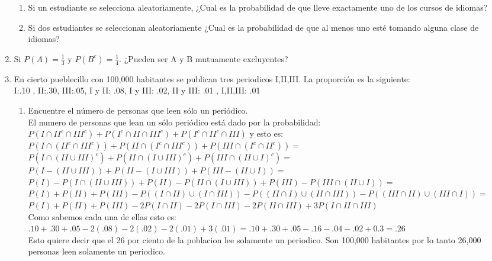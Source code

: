 \documentclass[12pt,a4paper]{report}
\begin{document}
\begin{enumerate}
{\begin{enumerate}[label=\alph*) ]
{   }

   \item {
   Si un estudiante se selecciona aleatoriamente, ¿Cual es la probabilidad de que lleve exactamente uno de los cursos de idiomas?\\

   }

   \item {
  Si dos estudiantes se seleccionan aleatoriamente ¿Cual es la probabilidad de que al menos uno esté tomando alguna clase de idiomas?\\

   }


	\end{enumerate}

	}

   \item {
  	Si $P(A) = \frac{1}{3}$ y $P(B^c)=\frac{1}{4}$. ¿Pueden ser A y B mutuamente excluyentes?
	}

   \item {
    En cierto pueblecillo con 100,000 habitantes se publican tres periodicos I,II,III. La proporción es la siguiente:\\
I:.10 , II:.30, III:.05, I y II: .08, I y III: .02, II y III: .01 , I,II,III: .01
	\begin{enumerate}[label=\alph*) ]
   \item {
   Encuentre el número de personas que leen sólo un periódico.\\
	El numero de personas que lean un sólo periódico está dado por la probabilidad:\\
	$P(I \cap II^c\cap III^c)+P(I^c \cap II\cap III^c)+P(I^c \cap II^c\cap III)$ y esto es:\\
	$P(I \cap( II^c \cap III^c))+ P(II\cap(I^c \cap III^c))+P(III \cap (I^c \cap II^c))=$ \\
	$P(I \cap (II \cup III)^c)+P(II \cap (I \cup III)^c)+P(III \cap (II \cup I)^c)=$\\
	$P(I-(II\cup III))+P(II-(I \cup III))+P(III-(II \cup I))=$\\
	$P(I)-P(I \cap (II \cup III))+P(II)-P(II \cap (I \cup III))+P(III)-P(III\cap (II\cup I))=$ \\
	$P(I)+P(II)+P(III)-P((I\cap II)\cup(I \cap III))-P((II\cap I)\cup(II \cap III))-P((III\cap II)\cup(III \cap I))=$\\
	$P(I)+P(II)+P(III)-2P(I\cap II)-2P(I\cap III)-2P(II \cap III)+3P(I\cap II \cap III)$ \\
	Como sabemos cada una de ellas esto es:\\
	$.10+.30+.05-2(.08)-2(.02)-2(.01)+3(.01)=.10+.30+.05-.16-.04-.02+0.3=.26$\\
	Esto quiere decir que el 26 por ciento de la poblacion lee solamente un periodico. Son 100,000 habitantes por lo tanto 26,000 personas leen solamente un periodico.
   }


\end{enumerate}}
\end{enumerate}
\end{document}

